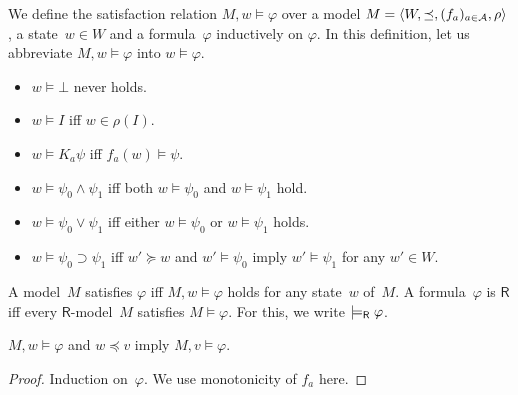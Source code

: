   \begin{definition}
   We define the satisfaction relation $M,w\models\varphi$ over a model
   $M = \langle{W,\preceq,(f_a)_{a\in \mathcal A},\rho}\rangle$, a state~$w\in W$ and a
   formula~$\varphi$ inductively on $\varphi$.
   In this definition, let
   us abbreviate $M,w\models \varphi$ into $w\models \varphi$\enspace.
   \newcommand{\m}{}
   \begin{itemize}
    \item $w\models \bot$ never holds.
    \item $w\models I$ iff
	  $w \in
	  \rho(I)$.
    \item	    $w\models K_a \psi$ iff
		    $f_a(w)\models \psi$.
    \item $w\models \psi_0\land\psi_1$ iff both
	  $w\models \psi_0$ and $w\models \psi_1$ hold.
    \item
	 $ w\models \psi_0\vee\psi_1$ iff either
	 $ w\models \psi_0$ or $w\models \psi_1$ holds.
    \item
	 $w\models \psi_0\supset\psi_1$ iff
	 $w'\succeq w$ and $w'\models \psi_0$ imply
	 $w'\models\psi_1$ for any $w'\in W$\enspace.
   \end{itemize}
  \end{definition}
  A model~$M$ satisfies $\varphi$ iff $M,w\models\varphi$ holds for any
  state~$w$ of~$M$.
  A formula~$\varphi$ is  $\mathsf R$ iff
  every $\mathsf R$-model~$M$ satisfies $M\models \varphi$.
  For this, we write $\models_{\mathsf R} \varphi$\enspace.

  \begin{proposition}
   \label{monot}
   $M,w\models\varphi$ and $w\preceq v$ imply
   $M,v\models\varphi$.
  \end{proposition}
  \begin{proof}
   Induction on~$\varphi$.
   We use monotonicity of $f_a$ here.
  \end{proof}

